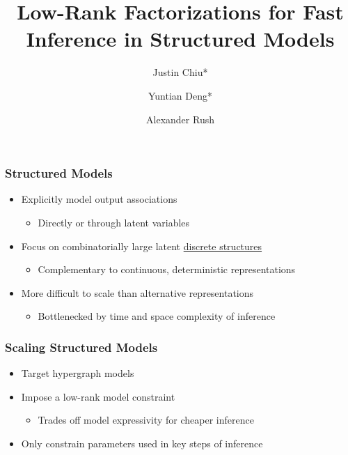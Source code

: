 \documentclass{beamer}
\title{Low-Rank Factorizations for Fast Inference in Structured Models}
\author{Justin Chiu* \inst{1} \and Yuntian Deng* \inst{2} \and Alexander Rush \inst{1}}
\institute[shortinst]{\inst{1} Cornell Tech \and \inst{2} Harvard University}
\begin{document}
\begin{frame}[plain]
\titlepage
\end{frame}

\begin{frame}
\frametitle{Structured Models}
\begin{itemize}
\item Explicitly model output associations
    \begin{itemize}
    \item Directly or through latent variables
    \end{itemize}
\vspace{1em}
\item Focus on combinatorially large latent \underline{discrete structures}
    \begin{itemize}
    \item Complementary to continuous, deterministic representations
    \end{itemize}
\vspace{1em}
\item More difficult to scale than alternative representations
\begin{itemize}
    \item Bottlenecked by time and space complexity of inference
    \end{itemize}
\end{itemize}
\end{frame}

\begin{frame}
\frametitle{Scaling Structured Models}

\begin{itemize}
\item Target hypergraph models
\vspace{1em}
\item Impose a low-rank model constraint
    \begin{itemize}
    \item Trades off model expressivity for cheaper inference
    \end{itemize}
\vspace{1em}
\item Only constrain parameters used in key steps of inference
\end{itemize}
\end{frame}
\end{document}
